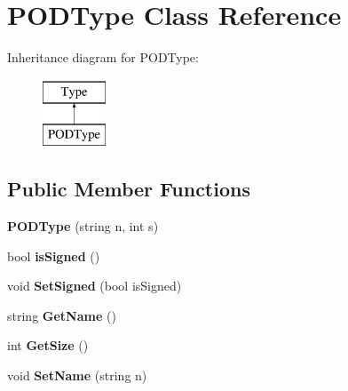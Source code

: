 \hypertarget{classPODType}{\section{P\-O\-D\-Type Class Reference}
\label{classPODType}
}
Inheritance diagram for P\-O\-D\-Type\-:\begin{figure}[H]
\begin{center}
\leavevmode
\includegraphics[height=2.000000cm]{classPODType}
\end{center}
\end{figure}
\subsection*{Public Member Functions}
\begin{DoxyCompactItemize}
\item 
\hypertarget{classPODType_a386ded726d22fbd62f3a2b49d8a29a6f}{{\bfseries P\-O\-D\-Type} (string n, int s)}\label{classPODType_a386ded726d22fbd62f3a2b49d8a29a6f}

\item 
\hypertarget{classPODType_ac64782a9fa6ecff753f4b59535ff8303}{bool {\bfseries is\-Signed} ()}\label{classPODType_ac64782a9fa6ecff753f4b59535ff8303}

\item 
\hypertarget{classPODType_ab76d7be88f388fadc10a0c34f3e576e8}{void {\bfseries Set\-Signed} (bool is\-Signed)}\label{classPODType_ab76d7be88f388fadc10a0c34f3e576e8}

\item 
\hypertarget{classType_a8143fe4686ae1a5709a5955396c6ee26}{string {\bfseries Get\-Name} ()}\label{classType_a8143fe4686ae1a5709a5955396c6ee26}

\item 
\hypertarget{classType_afe0fca035825759785b525d2a24f69fe}{int {\bfseries Get\-Size} ()}\label{classType_afe0fca035825759785b525d2a24f69fe}

\item 
\hypertarget{classType_ab8d2328a3a76289edf42b9bf0d4f278f}{void {\bfseries Set\-Name} (string n)}\label{classType_ab8d2328a3a76289edf42b9bf0d4f278f}

\end{DoxyCompactItemize}
